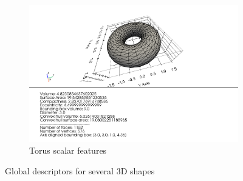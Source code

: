 \begin{figure}[ht!p]
    \begin{subfigure}[b]{0.45\textwidth}
        \includegraphics[width=\textwidth]{assets/feature_extraction/scalar_features/torus.png}
    \caption{Torus scalar features}
    \label{fig:torus-scalars}   
    \end{subfigure}

    \caption{Global descriptors for several 3D shapes}
    \label{fig:global-descriptors-proof} 
\end{figure}


